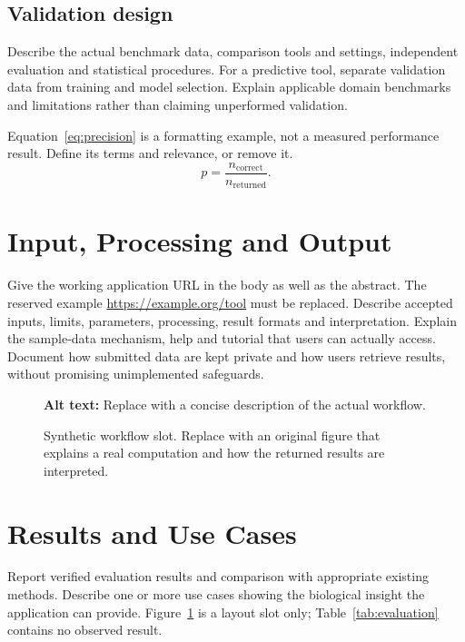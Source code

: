\documentclass[unnumsec,webpdf,modern,large]{oup-authoring-template}
\begin{document}
\subsection{Validation design}
Describe the actual benchmark data, comparison tools and settings,
independent evaluation and statistical procedures. For a predictive tool,
separate validation data from training and model selection. Explain
applicable domain benchmarks and limitations rather than claiming
unperformed validation.

Equation~\eqref{eq:precision} is a formatting example, not a measured
performance result. Define its terms and relevance, or remove it.
\begin{equation}
 p=\frac{n_{\mathrm{correct}}}{n_{\mathrm{returned}}}.
 \label{eq:precision}
\end{equation}

\section{Input, Processing and Output}\label{sec:workflow}
Give the working application URL in the body as well as the abstract.
The reserved example \url{https://example.org/tool} must be replaced.
Describe accepted inputs, limits, parameters, processing, result formats
and interpretation. Explain the sample-data mechanism, help and tutorial
that users can actually access. Document how submitted data are kept
private and how users retrieve results, without promising unimplemented
safeguards.

\begin{figure}[t]
\centering
{}
\caption{Synthetic workflow slot. Replace with an original figure that
explains a real computation and how the returned results are interpreted.}
\label{fig:workflow}
\par\smallskip\small\raggedright
\textbf{Alt text:} Replace with a concise description of the actual workflow.
\end{figure}

\section{Results and Use Cases}\label{sec:results}
Report verified evaluation results and comparison with appropriate
existing methods. Describe one or more use cases showing the biological
insight the application can provide. Figure~\ref{fig:workflow} is a layout
slot only; Table~\ref{tab:evaluation} contains no observed result.
\end{document}
